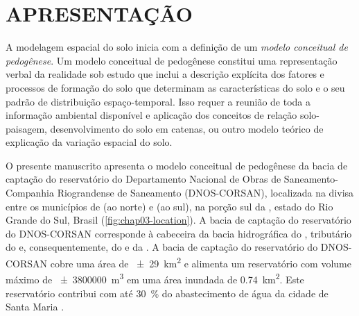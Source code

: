 \formatchapter

\section{APRESENTAÇÃO}
\label{sec:chap03-apresentacao}

A modelagem espacial do solo inicia com a definição de um \emph{modelo conceitual de pedogênese}. Um modelo 
conceitual de pedogênese constitui uma representação verbal da realidade sob estudo que inclui a descrição 
explícita dos fatores e processos de formação do solo que determinam as características do solo e o seu padrão 
de distribuição espaço-temporal. Isso requer a reunião de toda a informação ambiental disponível e aplicação 
dos conceitos de relação solo-paisagem, desenvolvimento do solo em catenas, ou outro modelo teórico de 
explicação da variação espacial do solo.

O presente manuscrito apresenta o modelo conceitual de pedogênese da bacia de captação do reservatório do 
Departamento Nacional de Obras de Saneamento-Companhia Riograndense de Saneamento (DNOS-CORSAN), localizada 
na divisa entre os municípios de \itaara{} (ao norte) e \santamaria{} (ao sul), na porção sul da 
\baciaparana{}, estado do Rio Grande do Sul, Brasil (\autoref{fig:chap03-location}). A bacia de captação do 
reservatório do DNOS-CORSAN corresponde à cabeceira da bacia hidrográfica do \riovacacaimirim{}, tributário do 
\riojacui{} e, consequentemente, do \rioguaiba{} e da \lagoadospatos{}. A bacia de captação do reservatório do 
DNOS-CORSAN cobre uma área de \SI{\pm29}{\square\kilo\metre} e alimenta um reservatório com volume máximo de 
\SI{\pm3800000}{\cubic\metre} em uma área inundada de \SI{0,74}{\square\kilo\metre}. Este reservatório 
contribui com até \SI{30}{\percent} do abastecimento de água da cidade de Santa Maria \cite{Dias2003, 
DillEtAl2004, Miguel2010}.

